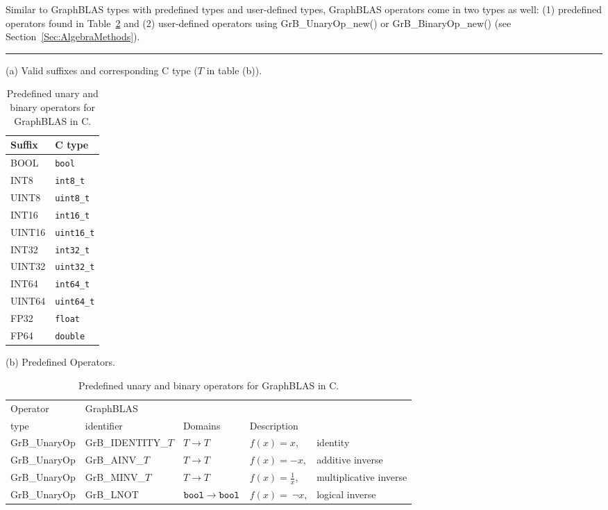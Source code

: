 Similar to GraphBLAS types with predefined types and user-defined types, 
GraphBLAS operators come in two types as well: (1) predefined operators 
found in Table~\ref{Tab:PredefinedOperators} and (2) user-defined operators 
using {\sf GrB\_UnaryOp\_new()} or {\sf GrB\_BinaryOp\_new()} (see Section~\ref{Sec:AlgebraMethods}).

\begin{table}
\hrule
\begin{center}
\caption{Predefined unary and binary operators for GraphBLAS in C.}
\label{Tab:PredefinedOperators}

\vspace{1\baselineskip}
(a) Valid suffixes and corresponding C type ($T$ in table (b)).
\vspace{1\baselineskip}

\begin{tabular}{l|l}
Suffix			& C type \\ \hline
{\sf BOOL}		& {\tt bool} \\
{\sf INT8}		& {\tt int8\_t} \\
{\sf UINT8}		& {\tt uint8\_t} \\
{\sf INT16}		& {\tt int16\_t} \\
{\sf UINT16}	& {\tt uint16\_t} \\
{\sf INT32}		& {\tt int32\_t} \\
{\sf UINT32}	& {\tt uint32\_t} \\
{\sf INT64}		& {\tt int64\_t} \\
{\sf UINT64}	& {\tt uint64\_t} \\
{\sf FP32}		& {\tt float} \\
{\sf FP64}		& {\tt double} \\
\end{tabular}

\vspace{1\baselineskip}
(b) Predefined Operators.
\vspace{1\baselineskip}

\begin{tabular}{l|l|l|ll}
Operator & GraphBLAS             &                                                              & \\
type     & identifier            & Domains                                              & Description \\ \hline
{\sf GrB\_UnaryOp}    & {\sf GrB\_IDENTITY\_$T$} & $T \rightarrow T $     & $f(x) = x$, &identity \\
{\sf GrB\_UnaryOp}    & {\sf GrB\_AINV\_$T$}     & $T \rightarrow T $     & $f(x) = -x$, &additive inverse \\
{\sf GrB\_UnaryOp}    & {\sf GrB\_MINV\_$T$}     & $T \rightarrow T $     & $f(x) = \frac{1}{x}$, &multiplicative inverse \\
{\sf GrB\_UnaryOp}    & {\sf GrB\_LNOT}          & ${\tt bool} \rightarrow {\tt bool}$  & $f(x) =~\neg x$, &logical inverse  \\


\end{tabular}
\end{center}
\end{table}
